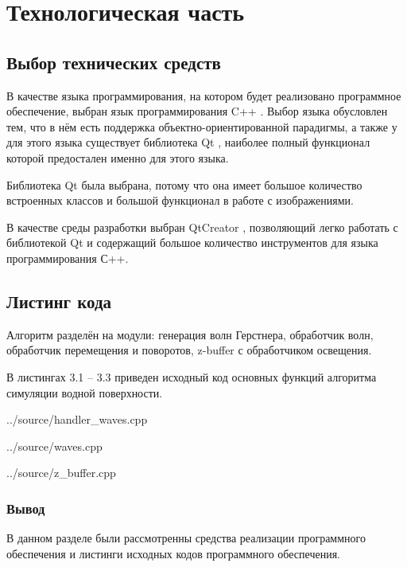 \chapter{Технологическая часть}


\section{Выбор технических средств}

В качестве языка программирования, на котором будет реализовано программное обеспечение, выбран язык программирования C++ \cite{cpp}. Выбор языка обусловлен тем, что в нём есть поддержка объектно-ориентированной парадигмы, а также у для этого языка существует библиотека Qt \cite{qt}, наиболее полный функционал которой предостален именно для этого языка. 

Библиотека Qt была выбрана, потому что она имеет большое количество встроенных классов и большой функционал в работе с изображениями.

В качестве среды разработки выбран QtCreator \cite{qtc}, позволяющий легко работать с библиотекой  Qt и содержащий большое количество инструментов для языка программирования С++.

\section{Листинг кода}
Алгоритм разделён на модули: генерация волн Герстнера, обработчик волн, обработчик перемещения и поворотов, z-buffer с обработчиком освещения.

В листингах 3.1 – 3.3 приведен исходный код основных функций алгоритма симуляции водной поверхности.

\begin{lstinputlisting}[
	caption={Файл реализации модуля обработчик волн.},
	label={lst:mhc},
	style={cpp},
	]{../source/handler_waves.cpp}
\end{lstinputlisting}


\begin{lstinputlisting}[
	caption={Файл реализации генерации волн.},
	label={lst:mhc},
	style={cpp},
	]{../source/waves.cpp}
\end{lstinputlisting}


\begin{lstinputlisting}[
	caption={Файл реализации z-buffer с обработчиком освещения.},
	label={lst:mhc},
	style={cpp},
	]{../source/z_buffer.cpp}
\end{lstinputlisting}


\newpage


\subsection*{Вывод}
В данном разделе были рассмотренны средства реализации программного обеспечения и листинги исходных кодов программного обеспечения.